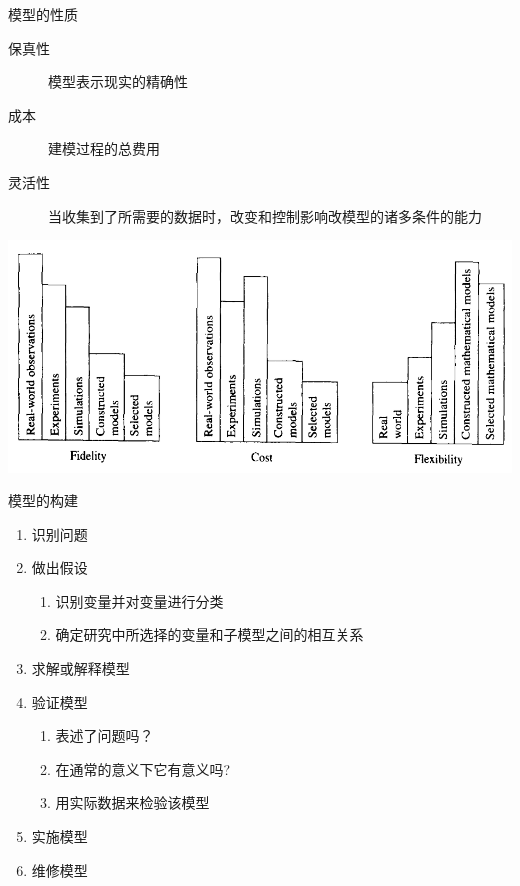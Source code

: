 \documentclass[mathserif]{beamer}
\begin{document}
\begin{frame}{模型的性质}
  \begin{description}
  \item[保真性] 模型表示现实的精确性
  \item[成本] 建模过程的总费用
  \item[灵活性] 当收集到了所需要的数据时，改变和控制影响改模型的诸多条件的能力
  \end{description}
  
  \begin{center}
    \includegraphics[width=.6\textwidth{}]{modelcompare.png}
  \end{center}
\end{frame}

\begin{frame}{模型的构建}

  \begin{enumerate}
  \item 识别问题
  \item 做出假设
    \begin{enumerate}
    \item 识别变量并对变量进行分类
    \item 确定研究中所选择的变量和子模型之间的相互关系
    \end{enumerate}
  \item 求解或解释模型
  \item 验证模型
    \begin{enumerate}
    \item 表述了问题吗？
    \item 在通常的意义下它有意义吗?
    \item 用实际数据来检验该模型
    \end{enumerate}
  \item 实施模型
  \item 维修模型
  \end{enumerate}
  
\end{frame}
\end{document}
